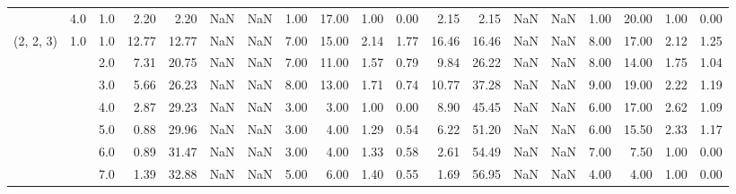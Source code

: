 \begin{tabular}{lllrrrrrrrrrrrrrrrr}
          & 4.0 & 1.0  &      2.20 &       2.20 &               NaN &                NaN &  1.00 &  17.00 &             1.00 &                         0.00 &      2.15 &       2.15 &               NaN &                NaN &  1.00 &  20.00 &             1.00 &                         0.00 \\
(2, 2, 3) & 1.0 & 1.0  &     12.77 &      12.77 &               NaN &                NaN &  7.00 &  15.00 &             2.14 &                         1.77 &     16.46 &      16.46 &               NaN &                NaN &  8.00 &  17.00 &             2.12 &                         1.25 \\
          &     & 2.0  &      7.31 &      20.75 &               NaN &                NaN &  7.00 &  11.00 &             1.57 &                         0.79 &      9.84 &      26.22 &               NaN &                NaN &  8.00 &  14.00 &             1.75 &                         1.04 \\
          &     & 3.0  &      5.66 &      26.23 &               NaN &                NaN &  8.00 &  13.00 &             1.71 &                         0.74 &     10.77 &      37.28 &               NaN &                NaN &  9.00 &  19.00 &             2.22 &                         1.19 \\
          &     & 4.0  &      2.87 &      29.23 &               NaN &                NaN &  3.00 &   3.00 &             1.00 &                         0.00 &      8.90 &      45.45 &               NaN &                NaN &  6.00 &  17.00 &             2.62 &                         1.09 \\
          &     & 5.0  &      0.88 &      29.96 &               NaN &                NaN &  3.00 &   4.00 &             1.29 &                         0.54 &      6.22 &      51.20 &               NaN &                NaN &  6.00 &  15.50 &             2.33 &                         1.17 \\
          &     & 6.0  &      0.89 &      31.47 &               NaN &                NaN &  3.00 &   4.00 &             1.33 &                         0.58 &      2.61 &      54.49 &               NaN &                NaN &  7.00 &   7.50 &             1.00 &                         0.00 \\
          &     & 7.0  &      1.39 &      32.88 &               NaN &                NaN &  5.00 &   6.00 &             1.40 &                         0.55 &      1.69 &      56.95 &               NaN &                NaN &  4.00 &   4.00 &             1.00 &                         0.00 \\

\end{tabular}

